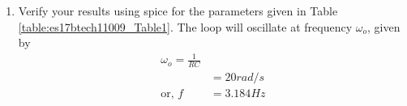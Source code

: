 \begin{enumerate}[label=\arabic*.,ref=\theenumi]
\begin{figure}[!ht]
\caption{}
\label{fig:es17btech11009_imp}
\end{figure}
\renewcommand{\thefigure}{\theenumi}
\begin{table}[!ht]
\centering

\caption{}
\label{table:es17btech11009_Table1}
\end{table}
\item Verify your results using spice for the parameters given in Table \ref{table:es17btech11009_Table1}.
\solution 
The loop will oscillate at frequency $\omega_{o}$, given by
\begin{align}
    \omega_{o} = \frac{1}{RC}
\\
 &= 20 rad/s
\\
\text{or, }
    f &=  3.184 Hz
\label{eq:es17btech11009_f}
\end{align}
%
%


\end{enumerate}

